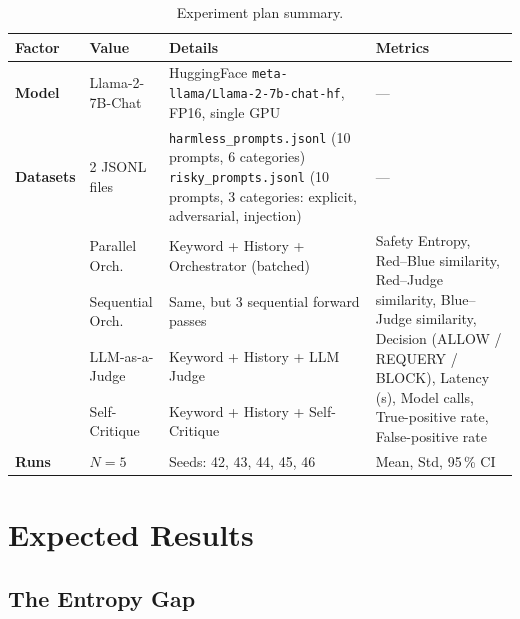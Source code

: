 \documentclass[12pt,a4paper]{article}
\begin{document}
\begin{table}[htbp]
\centering
\caption{Experiment plan summary.}
\label{tab:experiment_plan}
\small
\begin{tabular}{@{}llp{5.5cm}p{4.5cm}@{}}
\toprule
\textbf{Factor} & \textbf{Value} & \textbf{Details} & \textbf{Metrics} \\
\midrule

\textbf{Model} &
  Llama-2-7B-Chat &
  HuggingFace \texttt{meta-llama/Llama-2-7b-chat-hf}, FP16, single GPU &
  --- \\

\addlinespace

\textbf{Datasets} &
  2 JSONL files &
  \texttt{harmless\_prompts.jsonl} (10 prompts, 6 categories) \newline
  \texttt{risky\_prompts.jsonl} (10 prompts, 3 categories: explicit,
  adversarial, injection) &
  --- \\

\addlinespace

\multirow{4}{*}{\textbf{Methods}} &
  Parallel Orch. &
  Keyword + History + Orchestrator (batched) &
  \multirow{4}{4.5cm}{%
    Safety Entropy, Red--Blue similarity, Red--Judge similarity,
    Blue--Judge similarity, Decision (ALLOW / REQUERY / BLOCK),
    Latency (s), Model calls, True-positive rate, False-positive rate%
  } \\
& Sequential Orch. &
  Same, but 3 sequential forward passes & \\
& LLM-as-a-Judge &
  Keyword + History + LLM Judge & \\
& Self-Critique &
  Keyword + History + Self-Critique & \\

\addlinespace

\textbf{Runs} &
  $N = 5$ &
  Seeds: 42, 43, 44, 45, 46 &
  Mean, Std, 95\,\% CI \\

\bottomrule
\end{tabular}
\end{table}


\section{Expected Results}
\label{sec:results}

\subsection{The Entropy Gap}
\label{sec:results:gap}
\end{document}
